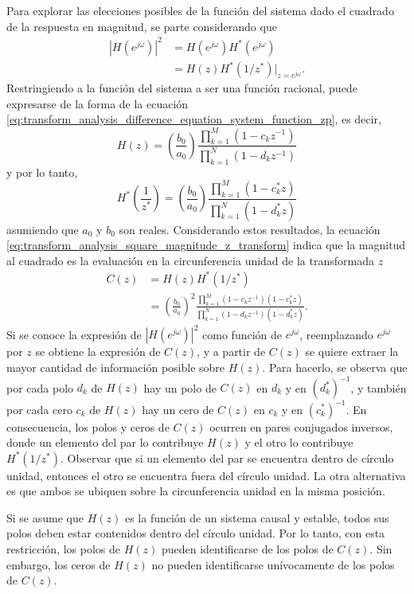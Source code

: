 \documentclass[a4paper]{report}
\begin{document}
Para explorar las elecciones posibles de la función del sistema dado el cuadrado de la respuesta en magnitud, se parte considerando que 
\begin{align}
 |H(e^{j\omega})|^2&=H(e^{j\omega})H^*(e^{j\omega})\nonumber\\
  &=H(z)H^*(1/z^*)\big|_{z=e^{j\omega}}.\label{eq:transform_analysis_square_magnitude_z_transform}
\end{align}
Restringiendo a la función del sistema a ser una función racional, puede expresarse de la forma de la ecuación \ref{eq:transform_analysis_difference_equation_system_function_zp}, es decir,
\[
 H(z)=\left(\frac{b_0}{a_0}\right)\frac{\prod\limits_{k=1}^M(1-c_kz^{-1})}{\prod\limits_{k=1}^N(1-d_kz^{-1})}
\]
y por lo tanto,
\[
 H^*\left(\frac{1}{z^*}\right)=\left(\frac{b_0}{a_0}\right)\frac{\prod\limits_{k=1}^M(1-c^*_kz)}{\prod\limits_{k=1}^N(1-d^*_kz)}
\]
asumiendo que \(a_0\) y \(b_0\) son reales. Considerando estos resultados, la ecuación \ref{eq:transform_analysis_square_magnitude_z_transform} indica que la magnitud al cuadrado es la evaluación en la circunferencia unidad de la transformada \(z\)
\begin{align}
 C(z)&=H(z)H^*(1/z^*)\nonumber\\
  &=\left(\frac{b_0}{a_0}\right)^2\frac{\prod\limits_{k=1}^M(1-c_kz^{-1})(1-c^*_kz)}{\prod\limits_{k=1}^N(1-d_kz^{-1})(1-d^*_kz)}.\label{eq:transform_analysis_square_magnitude_z_transform_cz}
\end{align}
Si se conoce la expresión de \(|H(e^{j\omega})|^2\) como función de \(e^{j\omega}\), reemplazando \(e^{j\omega}\) por \(z\) se obtiene la expresión de \(C(z)\), y a partir de \(C(z)\) se quiere extraer la mayor cantidad de información posible sobre \(H(z)\). Para hacerlo, se observa que por cada polo \(d_k\) de \(H(z)\) hay un polo de \(C(z)\) en \(d_k\) y en \((d_k^*)^{-1}\), y también por cada cero \(c_k\) de \(H(z)\) hay un cero de \(C(z)\) en \(c_k\) y en \((c_k^*)^{-1}\). En consecuencia, los polos y ceros de \(C(z)\) ocurren en pares conjugados inversos, donde un elemento del par lo contribuye \(H(z)\) y el otro lo contribuye \(H^*(1/z^*)\). Observar que si un elemento del par se encuentra dentro de círculo unidad, entonces el otro se encuentra fuera del círculo unidad. La otra alternativa es que ambos se ubiquen sobre la circunferencia unidad en la misma posición.

Si se asume que \(H(z)\) es la función de un sistema causal y estable, todos sus polos deben estar contenidos dentro del círculo unidad. Por lo tanto, con esta restricción, los polos de \(H(z)\) pueden identificarse de los polos de \(C(z)\). Sin embargo, los ceros de \(H(z)\) no pueden identificarse unívocamente de los polos de \(C(z)\).
\end{document}
